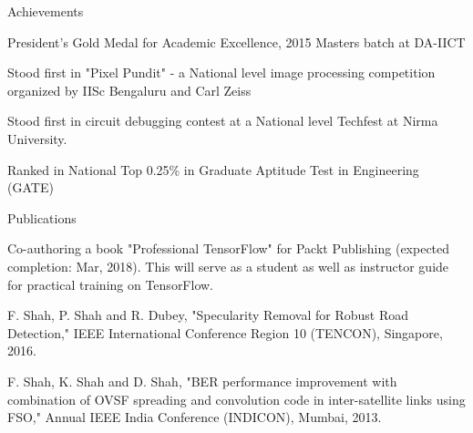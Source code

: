 \documentclass{resume} %
\begin{document}
	\begin{rSection}{Achievements} \itemsep -2pt
		\item President's Gold Medal for Academic Excellence, 2015 Masters batch at DA-IICT
		\item Stood first in "Pixel Pundit" - a National level image processing competition organized by IISc Bengaluru and Carl Zeiss
		\item Stood first in circuit debugging contest at a National level Techfest at Nirma
		University.
		\item Ranked in National Top 0.25\% in Graduate Aptitude Test in Engineering (GATE)

	\end{rSection}
	

	\begin{rSection}{Publications}
		\item Co-authoring a book "Professional TensorFlow" for Packt Publishing (expected completion: Mar, 2018). This will serve as a student as well as instructor guide for practical training on TensorFlow. 
		\item F. Shah, P. Shah and R. Dubey, "Specularity Removal for Robust Road Detection," IEEE International Conference Region 10 (TENCON), Singapore, 2016.
		\item F. Shah, K. Shah and D. Shah, "BER performance improvement with combination of OVSF spreading and convolution code in inter-satellite links using FSO," Annual IEEE India Conference (INDICON), Mumbai, 2013.
	\end{rSection}
		
\end{document}
